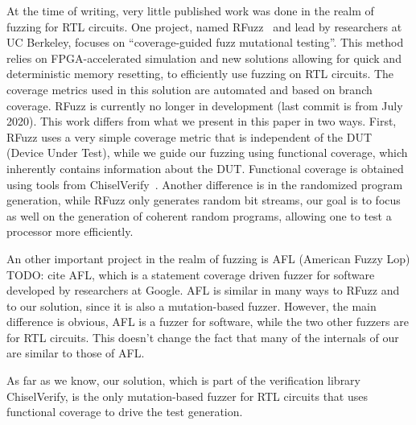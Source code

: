 \documentclass[conference]{IEEEtran}
\newcommand{\todo}[1]{{\color{olive} TODO: #1}}
\newcommand{\rewrite}[1]{{\color{red} rewrite: #1}}
\begin{document}
At the time of writing, very little published work was done in the realm of fuzzing for RTL circuits.
One project, named RFuzz~\cite{rfuzz2018} and lead by researchers at UC Berkeley, focuses on ``coverage-guided fuzz mutational testing''. This method relies on FPGA-accelerated simulation and new solutions allowing for quick and deterministic memory resetting, to efficiently use fuzzing on RTL circuits. The coverage metrics used in this solution are automated and based on branch coverage. RFuzz is currently no longer in development (last commit is from July 2020). This work differs from what we present in this paper in two ways. First, RFuzz uses a very simple coverage metric that is independent of the DUT (Device Under Test), while we guide our fuzzing using functional coverage, which inherently contains information about the DUT. Functional coverage is obtained using tools from ChiselVerify~\cite{verify:chisel:2020, dobis2021opensource}. Another difference is in the randomized program generation, while RFuzz only generates random bit streams, our goal is to focus as well on the generation of coherent random programs, allowing one to test a processor more efficiently. 

An other important project in the realm of fuzzing is AFL (American Fuzzy Lop)\todo{cite AFL}, which is a statement coverage driven fuzzer for software developed by researchers at Google. AFL is similar in many ways to RFuzz and to our solution, since it is also a mutation-based fuzzer. However, the main difference is obvious, AFL is a fuzzer for software, while the two other fuzzers are for RTL circuits. This doesn't change the fact that many of the internals of our are similar to those of AFL.

As far as we know, our solution, which is part of the verification library ChiselVerify, is the only mutation-based fuzzer for RTL circuits that uses functional coverage to drive the test generation.

\end{document}
